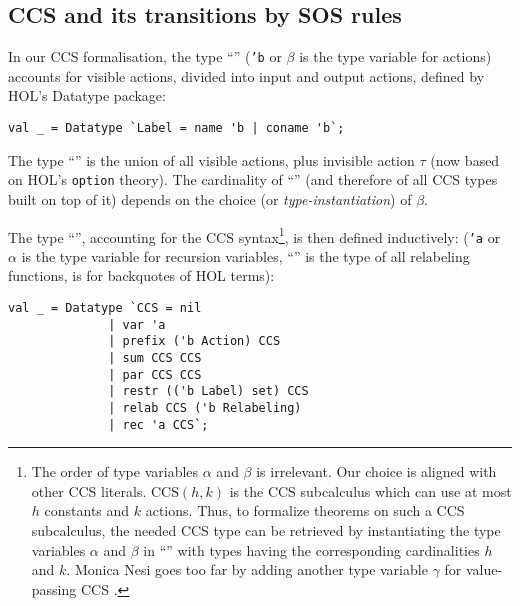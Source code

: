 
\subsection{CCS and its transitions by SOS rules}

In our CCS formalisation, the type ``'' (\texttt{'b} or
$\beta$ is the type variable for actions) accounts for visible actions, divided into input
and output actions, defined by HOL's Datatype package:
\begin{lstlisting}
val _ = Datatype `Label = name 'b | coname 'b`;
\end{lstlisting}
The type ``'' is the
union of all visible actions, plus invisible action $\tau$ (now based on
HOL's \texttt{option} theory). The cardinality of
``'' (and therefore of all
CCS types built on top of it)
 depends on the choice (or \emph{type-instantiation}) of $\beta$.

The type ``'', accounting for the CCS
syntax\footnote{The order of type variables $\alpha$ and $\beta$
    is irrelevant. Our choice is aligned with other CCS literals.
$\mathrm{CCS}(h,k)$ is the CCS subcalculus which can use at most $h$ constants
and $k$ actions. \cite{gorrieri2017ccs} Thus, to formalize theorems on
such a CCS subcalculus, the needed CCS type can be retrieved by instantiating the type
variables $\alpha$ and $\beta$ in ``'' with types
having the corresponding cardinalities $h$ and $k$. Monica Nesi goes
too far by adding another type variable $\gamma$ for value-passing CCS
\cite{Nesi:2017wo}.}, is then defined inductively:
(\texttt{'a} or $\alpha$ is the type variable for recursion variables,
``'' is the type of all relabeling functions,
\mbox{} is for backquotes of HOL terms):
\begin{lstlisting}
val _ = Datatype `CCS = nil
		      | var 'a
		      | prefix ('b Action) CCS
		      | sum CCS CCS
		      | par CCS CCS
		      | restr (('b Label) set) CCS
		      | relab CCS ('b Relabeling)
		      | rec 'a CCS`;
\end{lstlisting}


